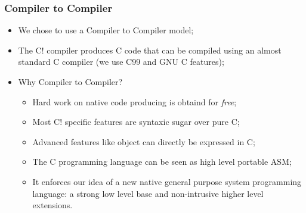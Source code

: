 \documentclass[pdftex]{beamer}
\begin{document}

\begin{frame}
  \frametitle{Compiler to Compiler}
  \begin{itemize}
  \item We chose to use a Compiler to Compiler model;
  \item The C! compiler produces C code that can be compiled using an
    almost standard C compiler (we use C99 and GNU C features);
  \item Why Compiler to Compiler?
    \begin{itemize}
    \item Hard work on native code producing is obtaind for \emph{free};
    \item Most C! specific features are syntaxic sugar over pure C;
    \item Advanced features like object can directly be expressed in C;
    \item The C programming language can be seen as high level portable ASM;
    \item It enforces our idea of a new native general purpose system
      programming language: a strong low level base and non-intrusive
      higher level extensions.
    \end{itemize}
  \end{itemize}
\end{frame}
\end{document}
